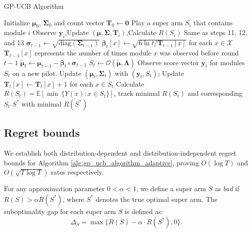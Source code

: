 \documentclass[opre,sglanonrev]{informs4}
\begin{document}
\begin{algorithm}
\caption{GP-UCB Algorithm}
\label{alg:gp_ucb_algorithm_adaptive}
\begin{algorithmic}[1]
\State Initialize $\boldsymbol{\mu}_0$, $\boldsymbol{\Sigma}_0$ and count vector $\mathbf{T}_0 \gets \mathbf{0}$ 
 
	\State Play a super arm $S_i$ that contains module $i$
	\State Observe $\mathbf{y}_i$,Update $(\boldsymbol{\mu}, \boldsymbol{\Sigma},\mathbf{T}_i)$,Calculate $R(S_i)$ \Comment Same as steps 11, 12, and 13
\EndFor
{} 
    \State $\boldsymbol{\sigma}_{t-1} \gets \sqrt{\text{diag}(\boldsymbol{\Sigma}_{t-1})}$ 
    \State $\boldsymbol{\beta}_t[x] \gets \sqrt{6 \ln t / \mathbf{T}_{t-1}[x]}$ for each $x \in \mathcal{X}$ \Comment $\mathbf{T}_{t-1}[x]$ represents the number of times module $x$ was observed before round $t-1$
    \State $\boldsymbol{\tilde{\mu}}_t \gets \boldsymbol{\mu}_{t-1} - \boldsymbol{\beta}_t \circ \boldsymbol{\sigma}_{t-1}$ 
    \State $S_t \gets \mathcal{O}(\boldsymbol{\tilde{\mu}}, \boldsymbol{\Lambda})$ 
    \State Observe score vector $\mathbf{y}_t$ for modules $S_t$ on a new pilot.
    \State Update $(\boldsymbol{\mu}_t, \boldsymbol{\Sigma}_t)$ with $(\mathbf{y}_t, S_t)$; Update $\mathbf{T}_t[x] \gets \mathbf{T}_t[x] + 1$ for each $x \in S_t$
    \State Calculate $R(S_t) = \mathbb{E}[\min\,\{Y(x) : x \in S_t\}]$, track minimal $R(S_t)$ and corresponding $S_t$ 
\EndFor
\State \Return $S^*$ with minimal $R(S^*)$
\end{algorithmic}
\end{algorithm}
\subsection{Regret bounds}
We establish both distribution-dependent and distribution-independent regret bounds for Algorithm \ref{alg:gp_ucb_algorithm_adaptive}, proving $O(\log T)$ and $O(\sqrt{T \log T})$ rates respectively.

For any approximation parameter $0 < \alpha < 1$, we define a super arm $S$ as \emph{bad} if $R(S) > \alpha R(S^*)$, where $S^*$ denotes the true optimal super arm. The suboptimality gap for each super arm $S$ is defined as:
$$
\Delta_S = \max\{R(S) - \alpha \cdot R(S^*), 0\}.
$$
\end{document}
